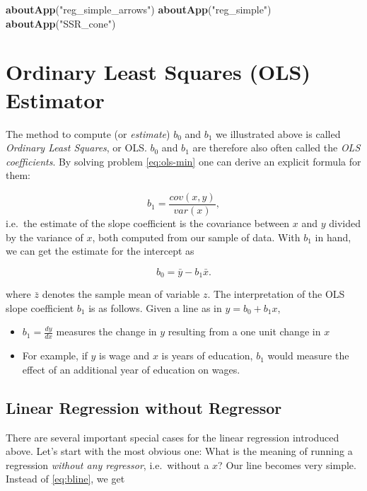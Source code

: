 \documentclass[]{book}
\newenvironment{Shaded}{\begin{snugshade}}{\end{snugshade}}
\newcommand{\KeywordTok}[1]{\textcolor[rgb]{0.13,0.29,0.53}{\textbf{#1}}}
\newcommand{\StringTok}[1]{\textcolor[rgb]{0.31,0.60,0.02}{#1}}
\newcommand{\NormalTok}[1]{#1}
\providecommand{\tightlist}{%
  \setlength{\itemsep}{0pt}\setlength{\parskip}{0pt}}
\theoremstyle{definition}
\theoremstyle{definition}
\theoremstyle{definition}
\theoremstyle{remark}
\begin{document}
\begin{Shaded}
\begin{Highlighting}[]
\KeywordTok{aboutApp}\NormalTok{(}\StringTok{"reg_simple_arrows"}\NormalTok{)}
\KeywordTok{aboutApp}\NormalTok{(}\StringTok{"reg_simple"}\NormalTok{) }
\KeywordTok{aboutApp}\NormalTok{(}\StringTok{"SSR_cone"}\NormalTok{) }
\end{Highlighting}
\end{Shaded}

\section{Ordinary Least Squares (OLS) Estimator}\label{OLS}

The method to compute (or \emph{estimate}) \(b_0\) and \(b_1\) we
illustrated above is called \emph{Ordinary Least Squares}, or OLS.
\(b_0\) and \(b_1\) are therefore also often called the \emph{OLS
coefficients}. By solving problem \eqref{eq:ols-min} one can derive an
explicit formula for them:

\[
b_1 = \frac{cov(x,y)}{var(x)},  \label{eq:beta1hat}
\] i.e.~the estimate of the slope coefficient is the covariance between
\(x\) and \(y\) divided by the variance of \(x\), both computed from our
sample of data. With \(b_1\) in hand, we can get the estimate for the
intercept as

\[
b_0 = \bar{y} - b_1 \bar{x}.  \label{eq:beta0hat}
\]

where \(\bar{z}\) denotes the sample mean of variable \(z\). The
interpretation of the OLS slope coefficient \(b_1\) is as follows. Given
a line as in \(y = b_0 + b_1 x\),

\begin{itemize}
\tightlist
\item
  \(b_1 = \frac{d y}{d x}\) measures the change in \(y\) resulting from
  a one unit change in \(x\)
\item
  For example, if \(y\) is wage and \(x\) is years of education, \(b_1\)
  would measure the effect of an additional year of education on wages.
\end{itemize}

\subsection{Linear Regression without
Regressor}\label{linear-regression-without-regressor}

There are several important special cases for the linear regression
introduced above. Let's start with the most obvious one: What is the
meaning of running a regression \emph{without any regressor},
i.e.~without a \(x\)? Our line becomes very simple. Instead of
\eqref{eq:bline}, we get
\end{document}
